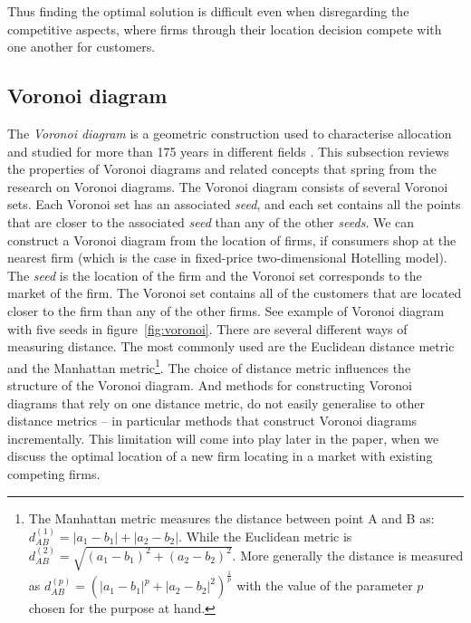 \documentclass[preprint, 12pt]{elsarticle}
\begin{document}
Thus finding the optimal solution is difficult even when disregarding the competitive aspects, where firms through their location decision compete with one another for customers.


\subsection{Voronoi diagram}

The \emph{Voronoi diagram} is a geometric construction used to characterise allocation and studied for more than 175 years in different fields \citep[chapter~19]{Eiselt_Marianov_2011}. This subsection reviews the properties of Voronoi diagrams and related concepts that spring from the research on Voronoi diagrams. The Voronoi diagram consists of several Voronoi sets. Each Voronoi set has an associated \emph{seed}, and each set contains all the points that are closer to the associated \emph{seed} than any of the other \emph{seeds}. We can construct a Voronoi diagram from the location of firms, if consumers shop at the nearest firm (which is the case in fixed-price two-dimensional Hotelling model). The \emph{seed} is the location of the firm and the Voronoi set corresponds to the market of the firm. The Voronoi set contains all of the customers that are located closer to the firm than any of the other firms. See example of Voronoi diagram with five seeds in figure~\ref{fig:voronoi}. There are several different ways of measuring distance. The most commonly used are the Euclidean distance metric and the Manhattan metric\footnote{The Manhattan metric measures the distance between point A and B as: $d^{(1)}_{AB} = \left| {a_1 - b_1} \right| + \left| {a_2 - b_2} \right|$. While the Euclidean metric is $d^{(2)}_{AB} = \sqrt{(a_1 - b_1)^2 + (a_2 - b_2)^2}$. More generally the distance is measured as $d^{(p)}_{AB} = \left({\left| {a_1 - b_1} \right|}^p + {\left| {a_2 - b_2} \right|}^2 \right)^{\frac{1}{p}}$ with the value of the parameter $p$ chosen for the purpose at hand.}. The choice of distance metric influences the structure of the Voronoi diagram. And methods for constructing Voronoi diagrams that rely on one distance metric, do not easily generalise to other distance metrics -- in particular methods that construct Voronoi diagrams incrementally. This limitation will come into play later in the paper, when we discuss the optimal location of a new firm locating in a market with existing competing firms.
\end{document}
